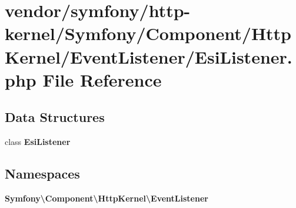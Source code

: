 \section{vendor/symfony/http-\/kernel/\+Symfony/\+Component/\+Http\+Kernel/\+Event\+Listener/\+Esi\+Listener.php File Reference}
\label{_esi_listener_8php}
\subsection*{Data Structures}
\begin{DoxyCompactItemize}
\item 
class {\bf Esi\+Listener}
\end{DoxyCompactItemize}
\subsection*{Namespaces}
\begin{DoxyCompactItemize}
\item 
 {\bf Symfony\textbackslash{}\+Component\textbackslash{}\+Http\+Kernel\textbackslash{}\+Event\+Listener}
\end{DoxyCompactItemize}
